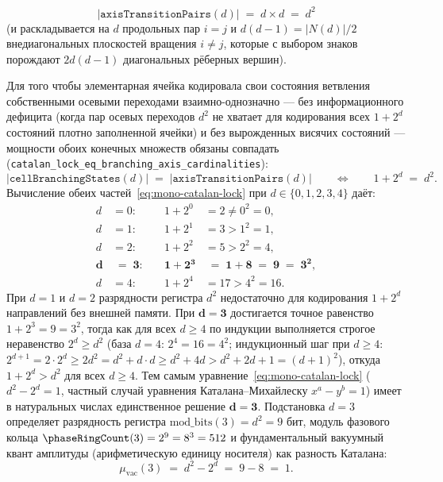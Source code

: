 \begin{enumerate}[label=\textbf{Шаг \arabic*.},leftmargin=*]
\begin{itemize}[noitemsep]
  \[
    |\texttt{axisTransitionPairs}(d)| \;=\; d \times d \;=\; d^2
  \]
  (и раскладывается на $d$ продольных пар $i = j$ и $d(d - 1) = |N(d)|/2$ внедиагональных плоскостей вращения $i \ne j$, которые с выбором знаков порождают $2d(d - 1)$ диагональных рёберных вершин).
  \end{itemize}
  Для того чтобы элементарная ячейка кодировала свои состояния ветвления собственными осевыми переходами взаимно-однозначно --- без информационного дефицита (когда пар осевых переходов $d^2$ не хватает для кодирования всех $1 + 2^d$ состояний плотно заполненной ячейки) и без вырожденных висячих состояний --- мощности обоих конечных множеств обязаны совпадать (\texttt{catalan\_lock\_eq\_branching\_axis\_cardinalities}):
  \begin{equation}
    \label{eq:mono-catalan-lock}
    |\texttt{cellBranchingStates}(d)| \;=\; |\texttt{axisTransitionPairs}(d)|
    \qquad\Longleftrightarrow\qquad
    1 + 2^d \;=\; d^2.
  \end{equation}
  Вычисление обеих частей~\eqref{eq:mono-catalan-lock} при $d \in \{0, 1, 2, 3, 4\}$ даёт:
  \[
    \begin{aligned}
      d &= 0: &\quad 1 + 2^0 &= 2 \ne 0^2 = 0, \\
      d &= 1: &\quad 1 + 2^1 &= 3 > 1^2 = 1, \\
      d &= 2: &\quad 1 + 2^2 &= 5 > 2^2 = 4, \\
      \mathbf{d} &\;=\; \mathbf{3}: &\quad \mathbf{1 + 2^3} &\;=\; \mathbf{1 + 8 \;=\; 9 \;=\; 3^2}, \\
      d &= 4: &\quad 1 + 2^4 &= 17 > 4^2 = 16.
    \end{aligned}
  \]
  При $d = 1$ и $d = 2$ разрядности регистра $d^2$ недостаточно для кодирования $1 + 2^d$ направлений без внешней памяти. При $\mathbf{d = 3}$ достигается точное равенство $1 + 2^3 = 9 = 3^2$, тогда как для всех $d \ge 4$ по индукции выполняется строгое неравенство $2^d \ge d^2$ (база $d = 4$: $2^4 = 16 = 4^2$; индукционный шаг при $d \ge 4$: $2^{d+1} = 2\cdot 2^d \ge 2d^2 = d^2 + d\cdot d \ge d^2 + 4d > d^2 + 2d + 1 = (d+1)^2$), откуда $1 + 2^d > d^2$ для всех $d \ge 4$. Тем самым уравнение~\eqref{eq:mono-catalan-lock} ($d^2 - 2^d = 1$, частный случай уравнения Каталана--Михайлеску $x^a - y^b = 1$) имеет в натуральных числах единственное решение $\mathbf{d = 3}$. Подстановка $d = 3$ определяет разрядность регистра $\mathrm{mod\_bits}(3) = d^2 = 9\text{ бит}$, модуль фазового кольца $\phaseRingCount(3) = 2^9 = 8^3 = 512$ и фундаментальный вакуумный квант амплитуды (арифметическую единицу носителя) как разность Каталана:
  \[
    \mu_{\mathrm{vac}}(3) \;=\; d^2 - 2^d \;=\; 9 - 8 \;=\; 1.
  \]


\end{enumerate}
